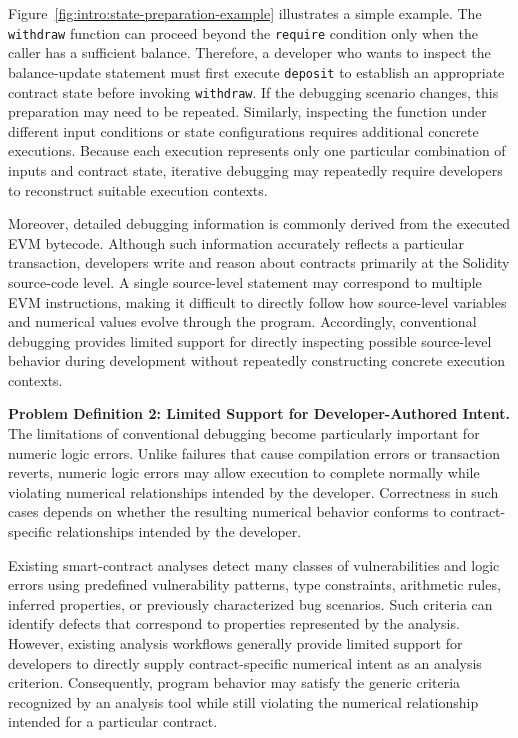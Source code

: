 \documentclass[11pt,oneside]{report}
\theoremstyle{plain}
\theoremstyle{definition}
\theoremstyle{remark}
\begin{document}
Figure~\ref{fig:intro:state-preparation-example} illustrates a simple example.
The \texttt{withdraw} function can proceed beyond the \texttt{require} condition only when the caller has a sufficient balance.
Therefore, a developer who wants to inspect the balance-update statement must first execute \texttt{deposit} to establish an appropriate contract state before invoking \texttt{withdraw}.
If the debugging scenario changes, this preparation may need to be repeated.
Similarly, inspecting the function under different input conditions or state configurations requires additional concrete executions.
Because each execution represents only one particular combination of inputs and contract state, iterative debugging may repeatedly require developers to reconstruct suitable execution contexts.

Moreover, detailed debugging information is commonly derived from the executed EVM bytecode.
Although such information accurately reflects a particular transaction, developers write and reason about contracts primarily at the Solidity source-code level.
A single source-level statement may correspond to multiple EVM instructions, making it difficult to directly follow how source-level variables and numerical values evolve through the program.
Accordingly, conventional debugging provides limited support for directly inspecting possible source-level behavior during development without repeatedly constructing concrete execution contexts.

\smallskip
\noindent\textbf{Problem Definition 2: Limited Support for Developer-Authored Intent.}
The limitations of conventional debugging become particularly important for numeric logic errors.
Unlike failures that cause compilation errors or transaction reverts, numeric logic errors may allow execution to complete normally while violating numerical relationships intended by the developer.
Correctness in such cases depends on whether the resulting numerical behavior conforms to contract-specific relationships intended by the developer.

Existing smart-contract analyses detect many classes of vulnerabilities and logic errors using predefined vulnerability patterns, type constraints, arithmetic rules, inferred properties, or previously characterized bug scenarios.
Such criteria can identify defects that correspond to properties represented by the analysis.
However, existing analysis workflows generally provide limited support for developers to directly supply contract-specific numerical intent as an analysis criterion.
Consequently, program behavior may satisfy the generic criteria recognized by an analysis tool while still violating the numerical relationship intended for a particular contract.
\end{document}
